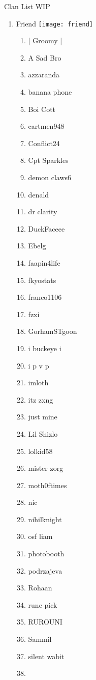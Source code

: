 \documentclass{article}
\begin{document}
Clan List WIP
\begin{enumerate}[I]
  \item 
    Friend \texttt{[image: friend]}
    \begin{enumerate}[I]
      \item
	| Groomy |
      \item
	A Sad Bro
      \item
	azzaranda
      \item
	banana phone
      \item
	Boi Cott
      \item
	cartmen948
      \item
	Conflict24
      \item
	Cpt Sparkles
      \item
	demon claws6
      \item
	denald
      \item
	dr clarity
      \item
	DuckFaceee
      \item
	Ebelg
      \item
	faapin4life
      \item
	fkyostats
      \item
	franco1106
      \item
	fzxi
      \item
	GorhamSTgoon
      \item
	i buckeye i
      \item
	i p v p
      \item
	imloth
      \item
	itz zxng
      \item
	just mine
      \item
	Lil Shizlo
      \item
	lolkid58
      \item
	mister zorg
      \item
	moth0ftimes
      \item
	nic
      \item
	nihilknight
      \item
	osf liam
      \item
	photobooth
      \item
	podrzajeva
      \item
	Rohaan
      \item
	rune pick
      \item
	RUROUNI
      \item
	Sammil
      \item
	silent wabit
      \item

\end{enumerate}
\end{enumerate}
\end{document}
